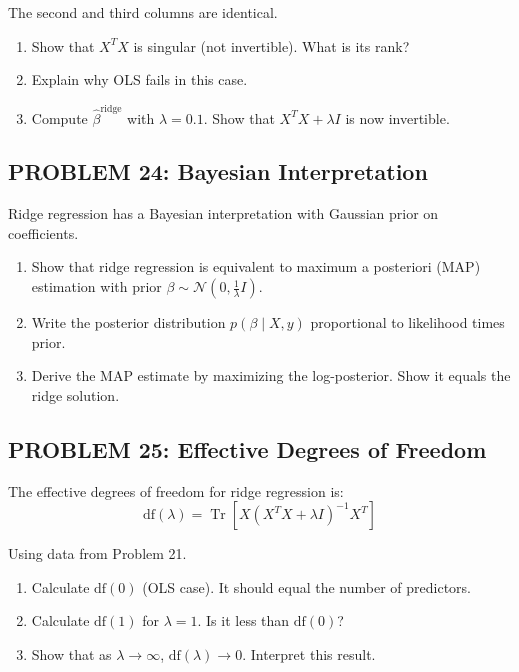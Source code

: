 \documentclass[12pt]{article}
\DeclareMathOperator{\Tr}{Tr}
\begin{document}
The second and third columns are identical.

\begin{enumerate}
\item[(a)] Show that \(X^TX\) is singular (not invertible). What is its rank?
\item[(b)] Explain why OLS fails in this case.
\item[(c)] Compute \(\hat{\beta}^{\text{ridge}}\) with \(\lambda = 0.1\). Show that \(X^TX + \lambda I\) is now invertible.
\end{enumerate}

\subsection*{PROBLEM 24: Bayesian Interpretation}

Ridge regression has a Bayesian interpretation with Gaussian prior on coefficients.

\begin{enumerate}
\item[(a)] Show that ridge regression is equivalent to maximum a posteriori (MAP) estimation with prior \(\beta \sim \mathcal{N}(0, \frac{1}{\lambda}I)\).
\item[(b)] Write the posterior distribution \(p(\beta \mid X, y)\) proportional to likelihood times prior.
\item[(c)] Derive the MAP estimate by maximizing the log-posterior. Show it equals the ridge solution.
\end{enumerate}

\subsection*{PROBLEM 25: Effective Degrees of Freedom}

The effective degrees of freedom for ridge regression is:
\[
\text{df}(\lambda) = \Tr[X(X^TX + \lambda I)^{-1}X^T]
\]

Using data from Problem 21.

\begin{enumerate}
\item[(a)] Calculate \(\text{df}(0)\) (OLS case). It should equal the number of predictors.
\item[(b)] Calculate \(\text{df}(1)\) for \(\lambda = 1\). Is it less than \(\text{df}(0)\)?
\item[(c)] Show that as \(\lambda \to \infty\), \(\text{df}(\lambda) \to 0\). Interpret this result.
\end{enumerate}
\end{document}
